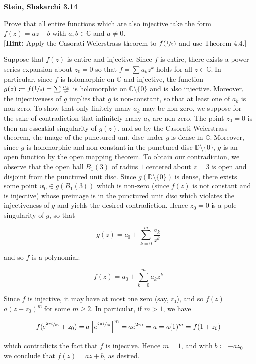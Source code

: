 \textbf{Stein, Shakarchi 3.14}

Prove that all entire functions which are also injective take the form $f(z) = az + b$ with $a, b \in \mathbb{C}$ and 
$a \ne 0$.
\ \\

[\textbf{Hint:} Apply the Casorati-Weierstrass theorem to $f(\sfrac{1}{z})$ and use Theorem 4.4.]

\begin{solution}
  Suppose that $f(z)$ is entire and injective. Since $f$ is entire, there exists a power series expansion about 
  $z_0 = 0$ so that $f = \sum {a_k z^k}$ holds for all $z \in \mathbb{C}$. In particular, since $f$ is holomorphic on 
  $\mathbb{C}$ and injective, the function $g(z) \coloneqq f(\sfrac{1}{z}) = \sum {\frac{a_k}{z^k}}$ is holomorphic on 
  $\mathbb{C} \setminus \{0\}$ and is also injective. Moreover, the injectiveness of $g$ implies that $g$ is 
  non-constant, so that at least one of $a_k$ is non-zero. To show that only finitely many $a_k$ may be non-zero, we 
  suppose for the sake of contradiction that infinitely many $a_k$ are non-zero. The point $z_0 = 0$ is then an 
  essential singularity of $g(z)$, and so by the Casorati-Weierstrass theorem, the image of the punctured unit disc 
  under $g$ is dense in $\mathbb{C}$. Moreover, since $g$ is holomorphic and non-constant in the punctured disc
  $\mathbb{D} \setminus \{0\}$, $g$ is an open function by the open mapping theorem. To obtain our contradiction, we 
  observe that the open ball $B_1(3)$ of radius $1$ centered about $z = 3$ is open and disjoint from the punctured unit 
  disc.  Since $g(\mathbb{D} \setminus \{0\})$ is dense, there exists some point $w_0 \in g(B_1(3))$ which is non-zero 
  (since $f(z)$ is not constant and is injective) whose preimage is in the punctured unit disc which violates the 
  injectiveness of $g$ and yields the desired contradiction. Hence $z_0 = 0$ is a pole singularity of $g$, so that

  $$
  g(z) = a_0 + \sum\limits_{k=0}^{m} \frac{a_k}{z^k}
  $$

  and so $f$ is a polynomial:

  $$
  f(z) = a_0 + \sum\limits_{k=0}^{m} {a_k  z^k}
  $$

  Since $f$ is injective, it may have at most one zero (say, $z_0$), and so $f(z)$ = $a (z - z_0)^m$ for some $m \ge 2$. 
  In particular, if $m > 1$, we have

  $$
  f(e^{\sfrac{2 \pi i}{m}} + z_0) = a \left[e^{\sfrac{2 \pi i}{m}}\right]^m = a e^{2 \pi i} = a = a (1)^m = f(1 + z_0)
  $$

  which contradicts the fact that $f$ is injective. Hence $m = 1$, and with $b \coloneqq -a z_0$ we conclude that
  $f(z) = a z  + b$, as desired.

  \ \\
\end{solution}